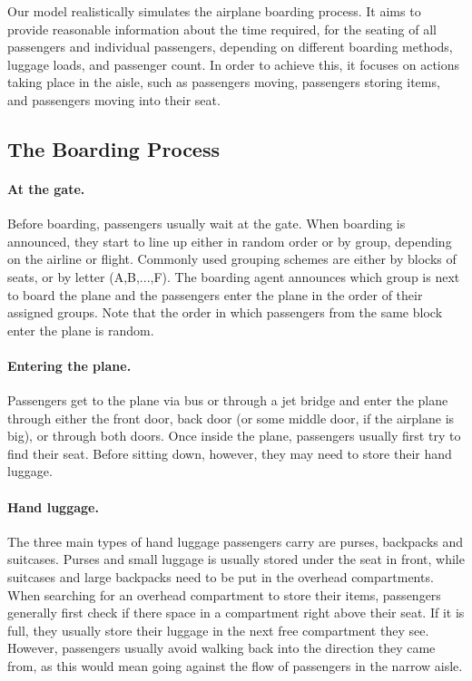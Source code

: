\documentclass[11pt]{article}
\begin{document}
Our model realistically simulates the airplane boarding process. It aims to provide reasonable information about the time required, for the seating of all passengers and individual passengers, depending on different boarding methods, luggage loads, and passenger count.  In order to achieve this, it focuses on actions taking place in the aisle, such as passengers moving, passengers storing items, and passengers moving into their seat.


\subsection{The Boarding Process}
\paragraph{At the gate.}
Before boarding, passengers usually wait at the gate. When boarding is announced, they start to line up either in random order or by group, depending on the airline or flight. Commonly used grouping schemes are either by blocks of seats, or by letter (A,B,...,F). The boarding agent announces which group is next to board the plane and the passengers enter the plane in the order of their assigned groups. Note that the order in which passengers from the same block enter the plane is random. 

\paragraph{Entering the plane.}
Passengers get to the plane via bus or through a jet bridge and enter the plane through either the front door, back door (or some middle door, if the airplane is big), or through both doors. Once inside the plane, passengers usually first try to find their seat.  Before sitting down, however, they may need to store their hand luggage. 
\paragraph{Hand luggage.} The three main types of hand luggage passengers carry are purses, backpacks and suitcases. Purses and small luggage is usually stored under the seat in front, while suitcases and large backpacks need to be put in the overhead compartments. When searching for an overhead compartment to store their items, passengers generally first check if there space in a compartment right above their seat. If it is full, they usually store their luggage in the next free compartment they see. However, passengers usually avoid walking back into the direction they came from, as this would mean going against the flow of passengers in the narrow aisle.
\end{document}
